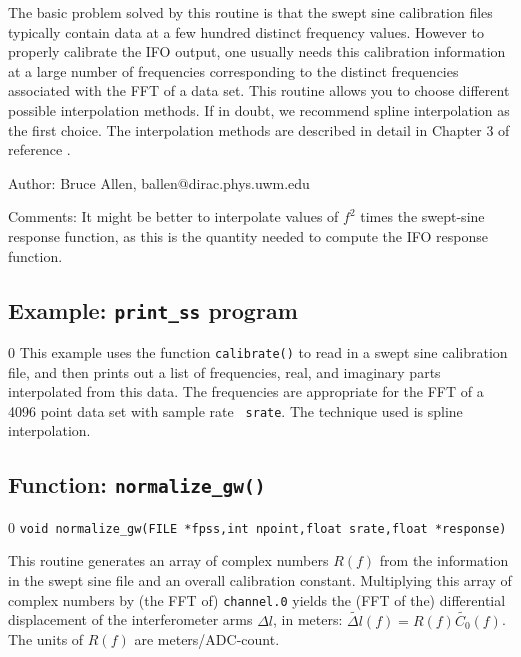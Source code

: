 The basic problem solved by this routine is that the swept sine
calibration files typically contain data at a few hundred distinct
frequency values.   However to properly calibrate the IFO output, one
usually needs this calibration information at a large number of
frequencies corresponding to the distinct frequencies associated with
the FFT of a data set.  This routine allows you to choose different
possible interpolation methods.  If in doubt, we recommend spline
interpolation as the first choice.  The interpolation methods are
described in detail in Chapter 3 of reference \cite{NumRec}.
\begin{description}
\item{Author:}  Bruce Allen, ballen@dirac.phys.uwm.edu
\item{Comments:}  It might be better to interpolate values of
$f^2$ times the swept-sine response function, as this is the quantity
needed to compute the IFO response function.
\end{description}
\clearpage

\subsection{Example: {\tt print\_ss} program}
\setcounter{equation}0
This example uses the function {\tt calibrate()} to read in a swept
sine calibration file, and then prints out a list of frequencies, real,
and imaginary parts interpolated from this data.  The frequencies are
appropriate for the FFT of a 4096 point data set with sample rate {\tt
srate}.   The technique used is spline interpolation.

\clearpage
\subsection{Function: {\tt normalize\_gw()}}
\label{s:normalize}
\setcounter{equation}0
{\tt void normalize\_gw(FILE *fpss,int npoint,float srate,float *response)}

This routine generates an array of complex numbers $R(f)$ from the
information in the swept sine file and an overall calibration
constant.  Multiplying this array of complex numbers by (the FFT of)
{\tt channel.0} yields the (FFT of the) differential displacement of
the interferometer arms $\Delta l$, in meters: $\widetilde{\Delta l}(f)
= R(f) \widetilde{C_0}(f)$.  The units of $R(f)$ are meters/ADC-count.

